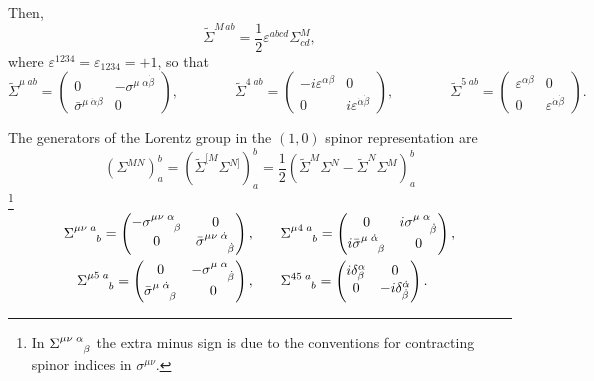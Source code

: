 Then,
\begin{equation}
\tilde \Sigma^{M\, ab} = \frac{1}{2} \varepsilon^{abcd} \Sigma^M_{cd},
\end{equation}  where \(\varepsilon^{1234}=\varepsilon_{1234}=+1\), so that
\begin{equation*}
	\tilde \Sigma^{\mu \; ab}
			=
		\begin{pmatrix}
			0 & - \sigma^{\mu \; \alpha  \dot{\beta} } \\
			\bar \sigma^{ \mu \; \dot \alpha \beta} & 0
		\end{pmatrix},
%
\qquad\qquad
%
	\tilde \Sigma^{4 \; ab}
		=
	\begin{pmatrix}
		-i\varepsilon^{\alpha \beta} & 0 \\
		0 & i \varepsilon^{\dot \alpha \dot \beta}
	\end{pmatrix},
%
\qquad\qquad
%
	\tilde \Sigma^{5 \; ab}
		=
	\begin{pmatrix}
		\varepsilon^{\alpha \beta} & 0 \\
		0 & \varepsilon^{\dot \alpha \dot \beta}
	\end{pmatrix}.
\end{equation*}



The generators of the Lorentz group in the $(1,0)$ spinor representation are 
\begin{equation*}
	\left( \Sigma^{MN}\right)^b_a =
	\left( \tilde \Sigma^{[M} \Sigma^{N]} \right)^b_a =
	\frac{1}{2} \left( \tilde \Sigma^{M} \Sigma^{N}
		- \tilde \Sigma^{N} \Sigma^{M}  \right)^b_a
\end{equation*}
\ie\hspace{-0.5em}\footnote{In \( \Sigma\indices{^{\mu\nu \;} ^{\alpha}  _{\beta} } \) the extra minus sign is due to the conventions for contracting spinor indices in $\sigma^{\mu\nu}$.}
\begin{align*}
	\Sigma\indices{^{\mu\nu \; }^a_b}
			=
		\begin{pmatrix}
			- \sigma\indices{^{\mu\nu \;} ^\alpha  _\beta } & 0 \\
			0 & \bar\sigma\indices{^{\mu\nu \;} ^{\dot \alpha} _{\dot\beta}} 
		\end{pmatrix},
%
& \qquad
%
	\Sigma\indices{^{\mu 4 \; }^a_b}
		=
	\begin{pmatrix}
		0 & i \sigma\indices{^{\mu\; } ^\alpha _{\dot \beta}} \\
		i \bar \sigma\indices{^{\mu\; } ^{\dot \alpha} _{\beta}} & 0
	\end{pmatrix},
\\
%
	\Sigma\indices{^{\mu 5 \; }^a_b}
		=
	\begin{pmatrix}
		0 & - \sigma\indices{^{\mu\; } ^\alpha _{\dot \beta}} \\
		\bar \sigma\indices{^{\mu\; } ^{\dot \alpha} _{\beta}} & 0
	\end{pmatrix},
%
& \qquad
%
	\Sigma\indices{^{4 5 \; }^a_b}
		=
	\begin{pmatrix}
		i \delta^\alpha_\beta & 0 \\
		0 & -i \delta^{\dot \alpha}_{\dot \beta} 
	\end{pmatrix}.
\end{align*}




